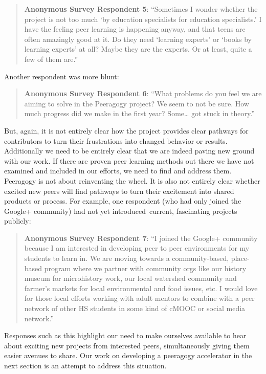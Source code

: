 \begin{quote}
\textbf{Anonymous Survey Respondent 5}: ``Sometimes I wonder whether the
project is not too much `by education specialists for education
specialists.' I have the feeling peer learning is happening anyway, and
that teens are often amazingly good at it. Do they need `learning
experts' or `books by learning experts' at all? Maybe they are the
experts. Or at least, quite a few of them are.''
\end{quote}

Another respondent was more blunt:

\begin{quote}
\textbf{Anonymous Survey Respondent 6}: ``What problems do you feel we
are aiming to solve in the Peeragogy project? We seem to not be sure.
How much progress did we make in the first year? Some\ldots{} got stuck
in theory.''
\end{quote}

But, again, it is not entirely clear how the project provides clear
pathways for contributors to turn their frustrations into changed
behavior or results. Additionally we need to be entirely clear that we
are indeed paving new ground with our work. If there are proven peer
learning methods out there we have not examined and included in our
efforts, we need to find and address them. Peeragogy is not about
reinventing the wheel. It is also not entirely clear whether excited new
peers will find pathways to turn their excitement into shared products
or process. For example, one respondent (who had only joined the Google+
community) had not yet introduced~current, fascinating projects
publicly:

\begin{quote}
\textbf{Anonymous Survey Respondent 7}: ``I joined the Google+ community
because I am interested in developing peer to peer environments for my
students to learn in. We are moving towards a community-based,
place-based program where we partner with community orgs like our
history museum for microhistory work, our local watershed community and
farmer's markets for local environmental and food issues, etc. I would
love for those local efforts working with adult mentors to combine with
a peer network of other HS students in some kind of cMOOC or social
media network.''
\end{quote}

Responses such as this highlight our need to make ourselves available to
hear about exciting new projects from interested peers, simultaneously
giving them easier avenues to share. Our work on developing a peeragogy
accelerator in the next section is an attempt to address this situation.

